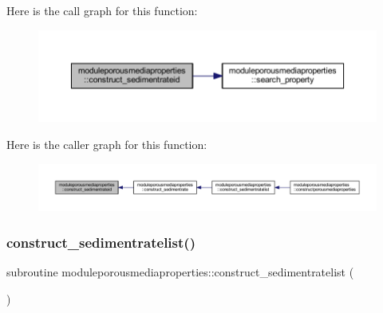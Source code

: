Here is the call graph for this function\+:\nopagebreak
\begin{figure}[H]
\begin{center}
\leavevmode
\includegraphics[width=350pt]{namespacemoduleporousmediaproperties_a4bcf212cc66413ac54a86d6f71dab6d6_cgraph}
\end{center}
\end{figure}
Here is the caller graph for this function\+:\nopagebreak
\begin{figure}[H]
\begin{center}
\leavevmode
\includegraphics[width=350pt]{namespacemoduleporousmediaproperties_a4bcf212cc66413ac54a86d6f71dab6d6_icgraph}
\end{center}
\end{figure}
\mbox{\label{namespacemoduleporousmediaproperties_acc3491b7ab1e55b078caa370b4c75601}} 
\subsubsection{\texorpdfstring{construct\+\_\+sedimentratelist()}{construct\_sedimentratelist()}}
{\footnotesize\ttfamily subroutine moduleporousmediaproperties\+::construct\+\_\+sedimentratelist (\begin{DoxyParamCaption}{ }\end{DoxyParamCaption})\hspace{0.3cm}{\ttfamily [private]}}

